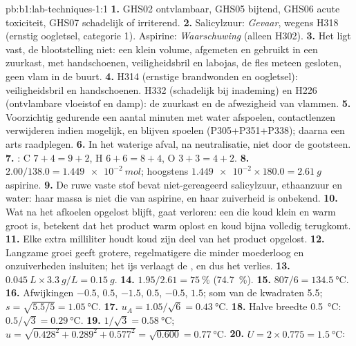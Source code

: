 \begin{solution}{pb:b1:lab-techniques-1:1}
\textbf{1.} GHS02 ontvlambaar, GHS05 bijtend, GHS06 acute toxiciteit,
GHS07 schadelijk of irriterend.
\textbf{2.} Salicylzuur: \emph{Gevaar}, wegens H318 (ernstig oogletsel,
categorie 1). Aspirine: \emph{Waarschuwing} (alleen H302).
\textbf{3.} Het  ligt vast, de blootstelling niet: een klein
volume, afgemeten en gebruikt in een zuurkast, met handschoenen,
veiligheidsbril en labojas, de fles meteen gesloten, geen vlam in de
buurt.
\textbf{4.} H314 (ernstige brandwonden en oogletsel): veiligheidsbril en
handschoenen. H332 (schadelijk bij inademing) en H226 (ontvlambare
vloeistof en damp): de zuurkast en de afwezigheid van vlammen.
\textbf{5.} Voorzichtig gedurende een aantal minuten met water afspoelen,
contactlenzen verwijderen indien mogelijk, en blijven spoelen
(P305+P351+P338); daarna een arts raadplegen.
\textbf{6.} In het waterige afval, na neutralisatie, niet door de
gootsteen.
\textbf{7.} : C $7 + 4 = 9 + 2$,
H $6 + 6 = 8 + 4$, O $3 + 3 = 4 + 2$.
\textbf{8.} $2.00/138.0 = \qty{1.449e-2}{mol}$; hoogstens
$\num{1.449e-2} \times 180.0 = \qty{2.61}{g}$ aspirine.
\textbf{9.} De ruwe vaste stof bevat niet-gereageerd salicylzuur,
ethaanzuur en water: haar massa is niet die van aspirine, en haar
zuiverheid is onbekend.
\textbf{10.} Wat na het afkoelen opgelost blijft, gaat verloren: een
 die koud klein en warm groot is, betekent dat het product
warm oplost en koud bijna volledig terugkomt.
\textbf{11.} Elke extra milliliter houdt koud zijn deel van het product
opgelost.
\textbf{12.} Langzame groei geeft grotere, regelmatigere  die
minder moederloog en onzuiverheden insluiten; het ijs verlaagt de
, en dus het verlies.
\textbf{13.} $\qty{0.045}{L} \times \qty{3.3}{g/L} = \qty{0.15}{g}$.
\textbf{14.} $1.95/2.61 = \qty{75}{\percent}$ (\qty{74.7}{\percent}).
\textbf{15.} $807/6 = \qty{134.5}{\celsius}$.
\textbf{16.} Afwijkingen $-0.5$, $0.5$, $-1.5$, $0.5$, $-0.5$, $1.5$; som
van de kwadraten 5.5; $s = \sqrt{5.5/5} = \qty{1.05}{\celsius}$.
\textbf{17.} $u_A = 1.05/\sqrt6 = \qty{0.43}{\celsius}$.
\textbf{18.} Halve breedte \qty{0.5}{\celsius}: $0.5/\sqrt3 = \qty{0.29}{\celsius}$.
\textbf{19.} $1/\sqrt3 = \qty{0.58}{\celsius}$;
$u = \sqrt{0.428^2 + 0.289^2 + 0.577^2} = \sqrt{0.600} = \qty{0.77}{\celsius}$.
\textbf{20.} $U = 2 \times 0.775 = \qty{1.5}{\celsius}$:

\end{solution}
